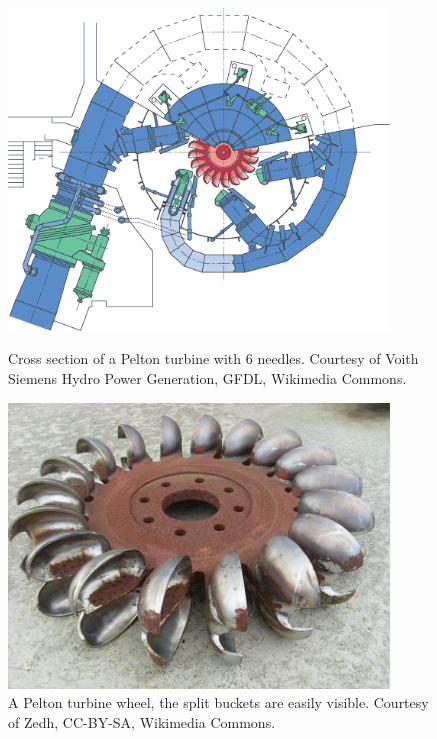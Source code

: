         
        \begin{figure}
            \begin{minipage}[b]{0.5\linewidth}
                \centering
                \includegraphics[width = 0.9\textwidth]{report/figures/introduction/pelton.png}
                \caption{Cross section of a Pelton turbine with $6$ needles. Courtesy of Voith Siemens Hydro Power Generation, GFDL, Wikimedia Commons.} %
                \label{fig:pelton_turbine}
            \end{minipage}
            \begin{minipage}[b]{0.5\linewidth}
                \centering
                \includegraphics[width = 0.9\textwidth]{report/figures/introduction/pelton_bucket.jpg}
                \caption{A Pelton turbine wheel, the split buckets are easily visible. Courtesy of Zedh, CC-BY-SA, Wikimedia Commons. } %
                \label{fig:pelton_bucket}
            \end{minipage}
        \end{figure}
        
